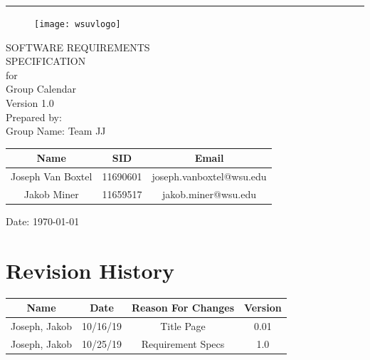 \documentclass{scrreprt}
\date{}
\def\myversion{1.0 }
\begin{document}
\begin{flushright}
    \begin{bfseries}
        \rule{1\textwidth}{5pt}\vskip1cm

        \begin{figure}[ht]
            \texttt{[image: wsuvlogo]}
        \end{figure}

        \Huge{SOFTWARE REQUIREMENTS\\ SPECIFICATION}\\
        \vspace{1cm}
        for\\
        \vspace{1cm}
       Group Calendar\\
        \vspace{1cm}
        \LARGE{Version \myversion}\\
        \vspace{1cm}
        Prepared by:\\
        Group Name: Team JJ
        \begin{center}
            \begin{tabular}{|c|c|c|}
                \hline
        	    Name & SID & Email\\
                \hline
        	    Joseph Van Boxtel & 11690601 & joseph.vanboxtel@wsu.edu\\
                \hline
        	    Jakob Miner & 11659517 & jakob.miner@wsu.edu\\
                \hline
            \end{tabular}
        \end{center}

        \vspace{1.9cm}
        Date: \today\\
    \end{bfseries}
\end{flushright}

\tableofcontents


\chapter*{Revision History}

\begin{center}
    \begin{tabular}{|c|c|c|c|}
        \hline
	    Name & Date & Reason For Changes & Version\\
        \hline
	    Joseph, Jakob & 10/16/19 & Title Page & 0.01\\
	    \hline
	    Joseph, Jakob & 10/25/19 & Requirement Specs & 1.0\\
        \hline
    \end{tabular}
\end{center}
\end{document}
